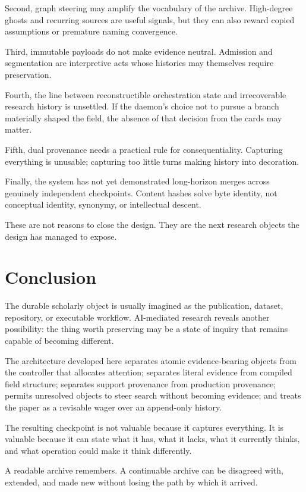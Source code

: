 \documentclass[
  11pt,
]{article}
\begin{document}
Second, graph steering may amplify the vocabulary of the archive.
High-degree ghosts and recurring sources are useful signals, but they
can also reward copied assumptions or premature naming convergence.

Third, immutable payloads do not make evidence neutral. Admission and
segmentation are interpretive acts whose histories may themselves
require preservation.

Fourth, the line between reconstructible orchestration state and
irrecoverable research history is unsettled. If the daemon's choice not
to pursue a branch materially shaped the field, the absence of that
decision from the cards may matter.

Fifth, dual provenance needs a practical rule for consequentiality.
Capturing everything is unusable; capturing too little turns making
history into decoration.

Finally, the system has not yet demonstrated long-horizon merges across
genuinely independent checkpoints. Content hashes solve byte identity,
not conceptual identity, synonymy, or intellectual descent.

These are not reasons to close the design. They are the next research
objects the design has managed to expose.

\section{Conclusion}\label{conclusion}

The durable scholarly object is usually imagined as the publication,
dataset, repository, or executable workflow. AI-mediated research
reveals another possibility: the thing worth preserving may be a state
of inquiry that remains capable of becoming different.

The architecture developed here separates atomic evidence-bearing
objects from the controller that allocates attention; separates literal
evidence from compiled field structure; separates support provenance
from production provenance; permits unresolved objects to steer search
without becoming evidence; and treats the paper as a revisable wager
over an append-only history.

The resulting checkpoint is not valuable because it captures everything.
It is valuable because it can state what it has, what it lacks, what it
currently thinks, and what operation could make it think differently.

A readable archive remembers. A continuable archive can be disagreed
with, extended, and made new without losing the path by which it
arrived.
\end{document}

